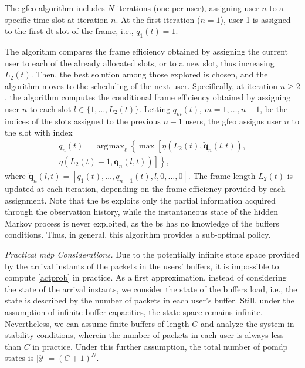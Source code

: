 \documentclass[conference]{IEEEtran}
\DeclareMathOperator*{\argmax}{\arg\!\max}
\begin{document}
The \ac{gfeo} algorithm includes $N$ iterations (one per user), assigning user $n$ to a specific time slot at iteration $n$. At the first iteration ($n=1$), user 1 is assigned to the first \ac{dt} slot of the frame, i.e., $q_1(t) = 1$. 

The algorithm compares the frame efficiency obtained by assigning the current user to each of the already allocated slots, or to a new slot, thus increasing $L_2(t)$. Then, the best solution among those explored is chosen, and the algorithm moves to the scheduling of the next user.
Specifically, at iteration $n\geq2$, the algorithm computes the conditional frame efficiency obtained by assigning user $n$ to each slot $l \in \{1,\ldots, L_2(t)\}$.
Letting $q_m(t)$, $m=1, \ldots, n-1$, be the indices of the slots assigned to the  previous $n-1$ users, the \ac{gfeo} assigns user $n$ to the slot with index
\begin{equation}
\begin{split}
    q_n(t) = \argmax_{\ell}\left\{\max\left[\eta(L_2(t), \tilde{\bm{q}}_{n}(l,t)), \right.\right.\\
    \left.\left.  \eta(L_2(t)+1, \tilde{\bm{q}}_{n}(l,t))\right]\right\},
\end{split}
\end{equation}
where $\tilde{\bm{q}}_{n}(l,t) = [q_1(t), \ldots, q_{n-1}(t), l, 0, \ldots, 0]$.
The frame length $L_2(t)$ is updated at each iteration, depending on the frame efficiency provided by each assignment.
Note that the \ac{bs} exploits only the partial information acquired through the observation history, while the instantaneous state of the hidden Markov process is never exploited, as the \ac{bs} has no knowledge of the buffers conditions. Thus, in general, this algorithm provides a sub-optimal policy.

\vspace{5pt}\noindent\emph{Practical \ac{mdp} Considerations.}
Due to the potentially infinite state space provided by the arrival instants of the packets in the users' buffers, it is impossible to compute \eqref{actprob} in practice. As a first approximation, instead of considering the state of the arrival instants, we consider the state of the buffers load, i.e., the state is described by the number of packets in each user's buffer.
Still, under the assumption of infinite buffer capacities, the state space remains infinite. Nevertheless, we can assume finite buffers of length $C$ and analyze the system in stability conditions, wherein the number of packets in each user is always less than $C$ in practice.
Under this further assumption, the total number of \ac{pomdp} states is $|\mathcal{Y}| = (C+1)^{N}$.
\end{document}
